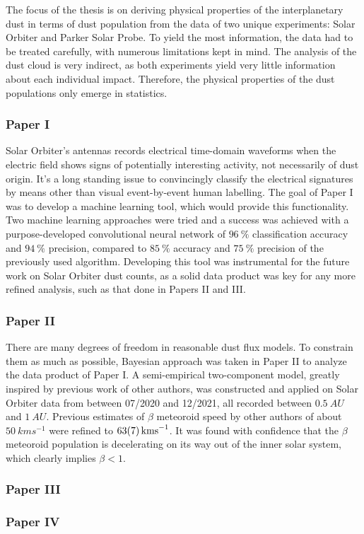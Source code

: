 The focus of the thesis is on deriving physical properties of the interplanetary dust in terms of dust population from the data of two unique experiments: Solar Orbiter and Parker Solar Probe. To yield the most information, the data had to be treated carefully, with numerous limitations kept in mind. The analysis of the dust cloud is very indirect, as both experiments yield very little information about each individual impact. Therefore, the physical properties of the dust populations only emerge in statistics. 

\subsubsection{Paper I}

Solar Orbiter's antennas records electrical time-domain waveforms when the electric field shows signs of potentially interesting activity, not necessarily of dust origin. It's a long standing issue to convincingly classify the electrical signatures by means other than visual event-by-event human labelling. The goal of Paper I was to develop a machine learning tool, which would provide this functionality. Two machine learning approaches were tried and a success was achieved with a purpose-developed convolutional neural network of $\SI{96}{\%}$ classification accuracy and $\SI{94}{\%}$ precision, compared to $\SI{85}{\%}$ accuracy and $\SI{75}{\%}$ precision of the previously used algorithm. Developing this tool was instrumental for the future work on Solar Orbiter dust counts, as a solid data product was key for any more refined analysis, such as that done in Papers II and III. 

\subsubsection{Paper II}

There are many degrees of freedom in reasonable dust flux models. To constrain them as much as possible, Bayesian approach was taken in Paper II to analyze the data product of Paper I. A semi-empirical two-component model, greatly inspired by previous work of other authors, was constructed and applied on Solar Orbiter data from between 07/2020 and 12/2021, all recorded between $\SI{0.5}{AU}$ and $\SI{1}{AU}$. Previous estimates of $\beta$ meteoroid speed by other authors of about $\SI{50}{kms^{-1}}$ were refined to $\SI{63 \pm 7}{kms^{-1}}$. It was found with confidence that the $\beta$ meteoroid population is decelerating on its way out of the inner solar system, which clearly implies $\beta < 1$. 

\subsubsection{Paper III}



\subsubsection{Paper IV}